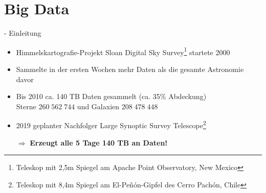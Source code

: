 \documentclass[fleqn,11pt,aspectratio=43]{beamer}
\begin{document}
		

\section{Big Data~}

\begin{frame}{\insertsectionhead - Einleitung \cite{mayer2014big} \cite{wu2014data}}
\begin{itemize}
\item Himmelskartografie-Projekt Sloan Digital Sky Survey\footnote{Teleskop mit 2,5m Spiegel am Apache Point Observatory, New Mexico} startete 2000
\item Sammelte in der ersten Wochen mehr Daten als die gesamte Astronomie davor\\ \vspace{1em}

\item Bis 2010 ca. 140 TB Daten gesammelt (ca. 35\% Abdeckung)\\
		Sterne	$260\;562\;744$ und Galaxien $208\;478\;448$ \cite{sdss3_scope:Online}
\item 2019 geplanter Nachfolger Large Synoptic Survey Telescope\footnote{Teleskop mit 8,4m Spiegel am El-Peñón-Gipfel des Cerro Pachón, Chile} \\ \vspace{1em}
\item[$\Rightarrow$] \textbf{Erzeugt alle 5 Tage 140 TB an Daten!}
\end{itemize}
\end{frame}
\end{document}
